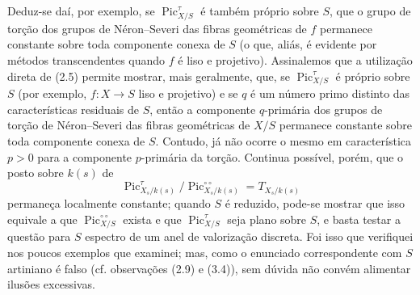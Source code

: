  Deduz-se daí, por exemplo, se
$\operatorname{Pic}_{X/S}^\tau$ é também próprio sobre $S$, que o grupo de torção
dos grupos de Néron--Severi das fibras geométricas de $f$ permanece constante
sobre toda componente conexa de $S$ (o que, aliás, é evidente por métodos
transcendentes quando $f$ é liso e projetivo). Assinalemos que a utilização
direta de (2.5) permite mostrar, mais geralmente, que, se
$\operatorname{Pic}_{X/S}^\tau$ é próprio sobre $S$ (por exemplo,
$f:X\longrightarrow S$ liso e projetivo) e se $q$ é um número primo distinto
das características residuais de $S$, então a componente $q$-primária dos
grupos de torção de Néron--Severi das fibras geométricas de $X/S$ permanece
constante sobre toda componente conexa de $S$. Contudo, já não ocorre o mesmo
em característica $p>0$ para a componente $p$-primária da torção. Continua
possível, porém, que o posto sobre $k(s)$ de
\[
\operatorname{Pic}_{X_s/k(s)}^\tau/
\operatorname{Pic}_{X_s/k(s)}^{\circ\circ}=T_{X_s/k(s)}
\]
permaneça localmente constante; quando $S$ é reduzido, pode-se mostrar que isso
equivale a que $\operatorname{Pic}_{X/S}^{\circ\circ}$ exista e que
$\operatorname{Pic}_{X/S}^\tau$ seja plano sobre $S$, e basta testar a questão
para $S$ espectro de um anel de valorização discreta. Foi isso que verifiquei
nos poucos exemplos que examinei; mas, como o enunciado correspondente com $S$
artiniano é falso (cf. observações (2.9) e (3.4)), sem dúvida não convém
alimentar ilusões excessivas.



